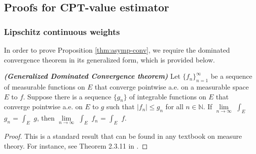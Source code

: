 

\subsection{Proofs for CPT-value estimator}
\label{appendix:cpt-est}

\subsubsection{Lipschitz continuous weights}
In order to prove Proposition \ref{thm:asymp-conv}, we require the dominated convergence theorem in its generalized form, which is provided below.
\begin{theorem}{\textbf{\textit{(Generalized Dominated Convergence theorem)}}}
Let $\{f_n\}_{n=1}^\infty$ be a sequence of measurable functions on $E$ that converge pointwise a.e. on a measurable space $E$ to $f$.  Suppose there is a sequence $\{g_n\}$ of integrable functions on $E$ that converge pointwise a.e. on $E$ to $g$ such that $|f_n| \leq g_n$ for all $n \in \mathbb{N}$.  
If $\lim\limits_{n \rightarrow \infty}$ $\int_E$ $g_n$ = $\int_E$ $g$, then $\lim\limits_{n \rightarrow \infty}$ $\int_E$ $f_n$ = $\int_E$ $f$.
\end{theorem}


\begin{proof}
This is a standard result that can be found in any textbook on measure theory. For instance, see Theorem 2.3.11 in \cite{athreya2006measure}.
\end{proof}


